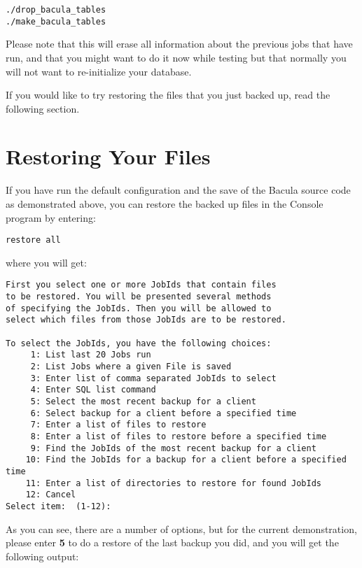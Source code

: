 \footnotesize
\begin{verbatim}
./drop_bacula_tables
./make_bacula_tables
\end{verbatim}
\normalsize

Please note that this will erase all information about the previous jobs that
have run, and that you might want to do it now while testing but that normally
you will not want to re-initialize your database. 

If you would like to try restoring the files that you just backed up, read the
following section. 
\label{restoring}

\section{Restoring Your Files}

If you have run the default configuration and the save of the Bacula source
code as demonstrated above, you can restore the backed up files in the Console
program by entering: 

\footnotesize
\begin{verbatim}
restore all
\end{verbatim}
\normalsize

where you will get: 

\footnotesize
\begin{verbatim}
First you select one or more JobIds that contain files
to be restored. You will be presented several methods
of specifying the JobIds. Then you will be allowed to
select which files from those JobIds are to be restored.

To select the JobIds, you have the following choices:
     1: List last 20 Jobs run
     2: List Jobs where a given File is saved
     3: Enter list of comma separated JobIds to select
     4: Enter SQL list command
     5: Select the most recent backup for a client
     6: Select backup for a client before a specified time
     7: Enter a list of files to restore
     8: Enter a list of files to restore before a specified time
     9: Find the JobIds of the most recent backup for a client
    10: Find the JobIds for a backup for a client before a specified time
    11: Enter a list of directories to restore for found JobIds
    12: Cancel
Select item:  (1-12): 
\end{verbatim}
\normalsize

As you can see, there are a number of options, but for the current
demonstration, please enter {\bf 5} to do a restore of the last backup you
did, and you will get the following output: 

